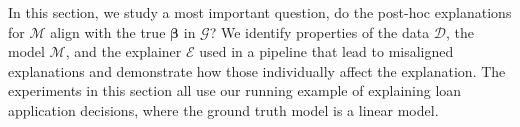 \documentclass[mnsc,blindrev]{informs3}
\newcommand{\mD}{\mathcal{D}}
\newcommand{\mM}{\mathcal{M}}
\newcommand{\mE}{\mathcal{E}}
\newcommand{\tw}[1]{\textcolor{red}{Tong: #1}}
\begin{document}
    In this section, we study a most important question, do the post-hoc explanations for $\mathcal{M}$  align with the true $\boldsymbol{\beta}$ in $\mathcal{G}$?
    We identify properties of the data $\mD$, the model $\mM$, and the explainer $\mE$ used in a pipeline that lead to misaligned explanations and demonstrate how those individually affect the explanation. The experiments in this section all use our running example of explaining loan application decisions, where the ground truth model is a linear model.%



    

    
\end{document}

